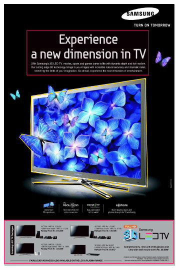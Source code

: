 \documentclass[hidelinks,11pt,a4paper]{report}
\begin{document}
\begin{figure}[!h]
\begin{subfigure}[b]{0.24\textwidth}
         \includegraphics[scale=0.22]{images/Image2.png}
     \end{subfigure}
     \begin{subfigure}[b]{0.24\textwidth}

\end{subfigure}
\end{figure}
\end{document}
